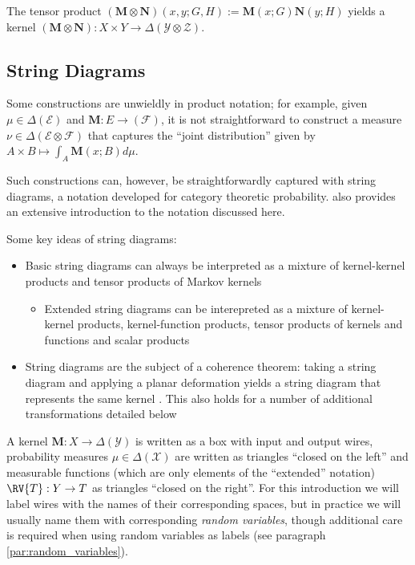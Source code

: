 The tensor product $(\mathbf{M}\otimes \mathbf{N})(x,y;G,H) := \mathbf{M}(x;G)\mathbf{N}(y;H)$ yields a kernel $(\mathbf{M}\otimes \mathbf{N}):X\times Y\to \Delta(\mathcal{Y}\otimes\mathcal{Z})$.

\subsection{String Diagrams}

Some constructions are unwieldly in product notation; for example, given $\mu\in \Delta(\mathcal{E})$ and $\mathbf{M}:E\to (\mathcal{F})$, it is not straightforward to construct a measure $\nu\in\Delta(\mathcal{E}\otimes\mathcal{F})$ that captures the ``joint distribution'' given by $A\times B\mapsto \int_A \mathbf{M}(x;B)d\mu$. 

Such constructions can, however, be straightforwardly captured with string diagrams, a notation developed for category theoretic probability. \citet{cho_disintegration_2019} also provides an extensive introduction to the notation discussed here.

Some key ideas of string diagrams:
\begin{itemize}
	\item Basic string diagrams can always be interpreted as a mixture of kernel-kernel products and tensor products of Markov kernels
	\begin{itemize}
	\item Extended string diagrams can be interepreted as a mixture of kernel-kernel products, kernel-function products, tensor products of kernels and functions and scalar products 
	\end{itemize}
	\item String diagrams are the subject of a coherence theorem: taking a string diagram and applying a planar deformation yields a string diagram that represents the same kernel \citep{selinger_survey_2010}. This also holds for a number of additional transformations detailed below
\end{itemize}

A kernel $\mathbf{M}:X\to \Delta(\mathcal{Y})$ is written as a box with input and output wires, probability measures $\mu\in \Delta(\mathcal{X})$ are written as triangles ``closed on the left'' and measurable functions (which are only elements of the ``extended'' notation) $\RV{T}:Y\to T$ as triangles ``closed on the right''. For this introduction we will label wires with the names of their corresponding spaces, but in practice we will usually name them with corresponding \emph{random variables}, though additional care is required when using random variables as labels (see paragraph \ref{par:random_variables}).


